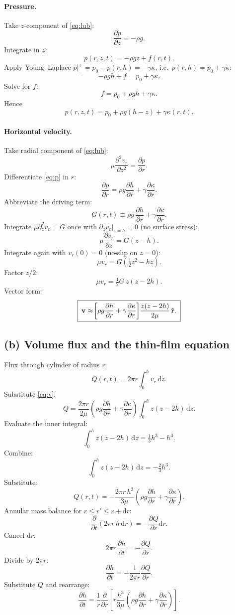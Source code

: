 \documentclass[11pt]{article}
\newcommand{\de}{\mathrm{d}}
\newcommand{\pd}[2]{\frac{\partial #1}{\partial #2}}
\newcommand{\pdd}[2]{\frac{\partial^{2} #1}{\partial #2^{2}}}
\newcommand{\rhat}{\hat{\mathbf{r}}}
\begin{document}
\paragraph{Pressure.} Take $z$-component of \eqref{eq:lub}:
\[ \pd{p}{z} = -\rho g. \]
Integrate in $z$:
\[ p(r,z,t) = -\rho g z + f(r,t). \]
Apply Young--Laplace $p|_-^+ = p_0 - p(r,h) = -\gamma\kappa$, i.e.\ $p(r,h) = p_0+\gamma\kappa$:
\[ -\rho g h + f = p_0 + \gamma\kappa. \]
Solve for $f$:
\[ f = p_0 + \rho g h + \gamma\kappa. \]
Hence
\begin{equation}
\boxed{\;p(r,z,t) = p_0 + \rho g(h-z) + \gamma\kappa(r,t).\;}
\label{eq:p}
\end{equation}

\paragraph{Horizontal velocity.} Take radial component of \eqref{eq:lub}:
\[ \mu\pdd{v_r}{z} = \pd{p}{r}. \]
Differentiate \eqref{eq:p} in $r$:
\[ \pd{p}{r} = \rho g\pd{h}{r} + \gamma\pd{\kappa}{r}. \]
Abbreviate the driving term:
\[ G(r,t) \equiv \rho g\,\pd{h}{r} + \gamma\pd{\kappa}{r}. \]
Integrate $\mu\partial_z^{2}v_r = G$ once with $\partial_z v_r|_{z=h}=0$ (no surface stress):
\[ \mu\pd{v_r}{z} = G(z-h). \]
Integrate again with $v_r(0)=0$ (no-slip on $z=0$):
\[ \mu v_r = G\!\left(\tfrac12 z^{2} - hz\right). \]
Factor $z/2$:
\[ \mu v_r = \tfrac12 G\,z(z-2h). \]
Vector form:
\begin{equation}
\boxed{\;\vb v\approx\!\left[\rho g\pd{h}{r} + \gamma\pd{\kappa}{r}\right]\!\frac{z(z-2h)}{2\mu}\,\rhat.\;}
\label{eq:v}
\end{equation}

\subsection*{(b) Volume flux and the thin-film equation}

Flux through cylinder of radius $r$:
\[ Q(r,t) = 2\pi r\int_{0}^{h}v_r\,\de z. \]
Substitute \eqref{eq:v}:
\[ Q = \frac{2\pi r}{2\mu}\!\left(\rho g\pd{h}{r}+\gamma\pd{\kappa}{r}\right)\!\int_{0}^{h}z(z-2h)\,\de z. \]
Evaluate the inner integral:
\[ \int_{0}^{h}z(z-2h)\,\de z = \tfrac13 h^{3} - h^{3}. \]
Combine:
\[ \int_{0}^{h}z(z-2h)\,\de z = -\tfrac23 h^{3}. \]
Substitute:
\[ Q(r,t) = -\frac{2\pi r\,h^{3}}{3\mu}\!\left(\rho g\pd{h}{r}+\gamma\pd{\kappa}{r}\right). \]
Annular mass balance for $r\le r'\le r+\de r$:
\[ \pd{}{t}(2\pi r\,h\,\de r) = -\pd{Q}{r}\de r. \]
Cancel $\de r$:
\[ 2\pi r\,\pd{h}{t} = -\pd{Q}{r}. \]
Divide by $2\pi r$:
\[ \pd{h}{t} = -\frac{1}{2\pi r}\pd{Q}{r}. \]
Substitute $Q$ and rearrange:
\begin{equation}
\boxed{\;\pd{h}{t} = \frac{1}{r}\pd{}{r}\!\left[r\frac{h^{3}}{3\mu}\!\left(\rho g\pd{h}{r}+\gamma\pd{\kappa}{r}\right)\right].\;}
\label{eq:thinfilm}
\end{equation}
\end{document}
